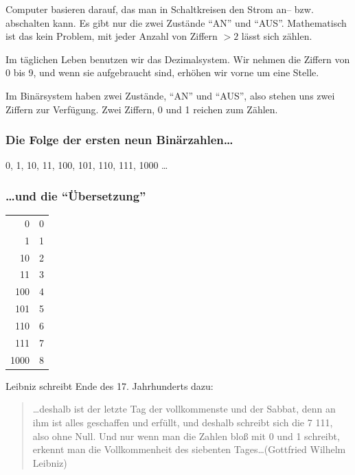   Computer basieren darauf, das man in Schaltkreisen den Strom an--  bzw. abschalten kann. Es gibt nur die zwei Zustände ``AN'' und ``AUS''. Mathematisch ist das kein Problem, mit jeder Anzahl von Ziffern $>2$ lässt sich zählen. 

  Im täglichen Leben benutzen wir das Dezimalsystem. Wir nehmen die Ziffern von 0 bis 9, und wenn sie aufgebraucht sind, erhöhen wir vorne um eine Stelle. 

  Im Binärsystem haben zwei Zustände, ``AN'' und ``AUS'', also stehen uns zwei Ziffern zur Verfügung. Zwei Ziffern, 0 und 1 reichen zum Zählen.

  \begin{frame}
  \frametitle{Die Folge der ersten neun Binärzahlen\ldots}
    \begin{center}
      0, 1, 10, 11, 100, 101, 110, 111, 1000 \ldots
    \end{center}
  \end{frame}

  \begin{frame}
  \frametitle{\ldots und die ``Übersetzung''}
    \begin{center}
      \begin{tabular}{rr}
        0 & 0\\
        1 & 1\\
        10 & 2\\
        11 & 3\\
        100 & 4\\
        101 & 5\\
        110 & 6\\
        111 & 7\\
        1000 & 8\\
      \end{tabular}
    \end{center}
  \end{frame}

  Leibniz schreibt Ende des 17. Jahrhunderts dazu:
  \begin{frame}
    \begin{quote}
      \ldots deshalb ist der letzte Tag der vollkommenste und der Sabbat, denn an ihm ist alles geschaffen und erfüllt, und deshalb schreibt sich die 7 111, also ohne Null. Und nur wenn man die Zahlen bloß mit 0 und 1 schreibt, erkennt man die Vollkommenheit des siebenten Tages\ldots \hfill (Gottfried Wilhelm Leibniz)
    \end{quote}
  \end{frame}
  
